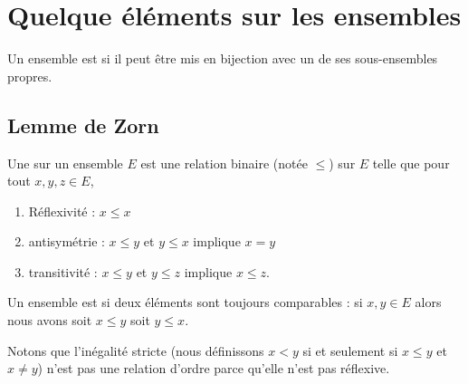 

\section{Quelque éléments sur les ensembles}

\begin{definition}      \label{DefEOZLooUMCzZR}
    Un ensemble est  si il peut être mis en bijection avec un de ses sous-ensembles propres.
\end{definition}

\subsection{Lemme de Zorn}

\begin{definition}      \label{DefooFLYOooRaGYRk}
    Une  sur un ensemble \( E\) est une relation binaire (notée \( \leq\)) sur \( E\) telle que pour tout \( x,y,z\in E\),
    \begin{enumerate}
        \item
            Réflexivité : \( x\leq x\)
        \item
            antisymétrie : \( x\leq y\) et \( y\leq x\) implique \( x=y\)
        \item
            transitivité : \( x\leq y\) et \( y\leq z\) implique \( x\leq z\).
    \end{enumerate}
    Un ensemble est  si deux éléments sont toujours comparables : si \( x,y\in E\) alors nous avons soit \( x\leq y\) soit \( y\leq x\).
\end{definition}
Notons que l'inégalité stricte (nous définissons \( x<y\) si et seulement si \( x\leq y\) et \( x\neq y\)) n'est pas une relation d'ordre parce qu'elle n'est pas réflexive.

